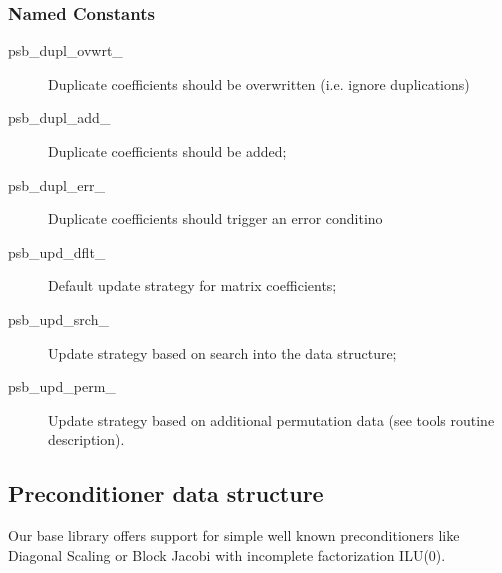 \subsubsection{Named Constants}
\label{sec:sp_constants}
\begin{description}
\item[psb\_dupl\_ovwrt\_] Duplicate coefficients should be overwritten
  (i.e. ignore duplications)
\item[psb\_dupl\_add\_] Duplicate coefficients should be added;	         
\item[psb\_dupl\_err\_] Duplicate coefficients should trigger an error conditino
\item[psb\_upd\_dflt\_] Default update strategy for matrix coefficients;
\item[psb\_upd\_srch\_] Update strategy based on search into the data structure;
\item[psb\_upd\_perm\_] Update strategy based on additional
  permutation data (see tools routine description).
\end{description}



\subsection{Preconditioner data structure}
\label{sec:prec}
Our base library  offers support for  simple well known preconditioners
like Diagonal Scaling or Block Jacobi with incomplete
factorization ILU(0). 

